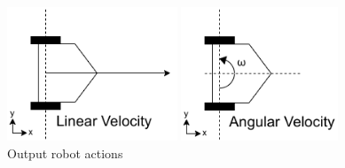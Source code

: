 \begin{figure}[h]
  \centering
  \begin{minipage}[c]{65mm} 
      \centering
      \includegraphics[height=40mm]{images/RobotGuidance_linear_velocity.png}
  \end{minipage}
  \begin{minipage}[c]{65mm} 
      \centering
      \includegraphics[height=40mm]{images/RobotGuidance_angular_velocity.png}
  \end{minipage}
  \caption{Output robot actions}
  \label{Fig:RobotGuidance_velocity}
\end{figure}

\newpage
